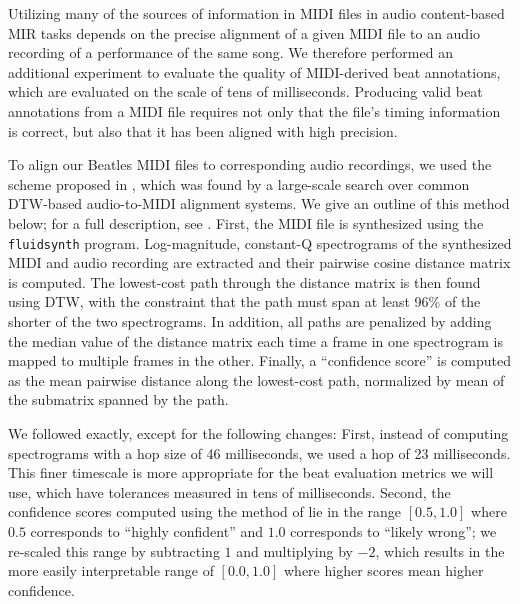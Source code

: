 \documentclass{article}
\begin{document}
Utilizing many of the sources of information in MIDI files in audio content-based MIR tasks depends on the precise alignment of a given MIDI file to an audio recording of a performance of the same song.
We therefore performed an additional experiment to evaluate the quality of MIDI-derived beat annotations, which are evaluated on the scale of tens of milliseconds.
Producing valid beat annotations from a MIDI file requires not only that the file's timing information is correct, but also that it has been aligned with high precision.

To align our Beatles MIDI files to corresponding audio recordings, we used the scheme proposed in \cite{raffel2016optimizing}, which was found by a large-scale search over common DTW-based audio-to-MIDI alignment systems.
We give an outline of this method below; for a full description, see \cite{raffel2016optimizing}.
First, the MIDI file is synthesized using the \texttt{fluidsynth} program.
Log-magnitude, constant-Q spectrograms of the synthesized MIDI and audio recording are extracted and their pairwise cosine distance matrix is computed.
The lowest-cost path through the distance matrix is then found using DTW, with the constraint that the path must span at least 96\% of the shorter of the two spectrograms.
In addition, all paths are penalized by adding the median value of the distance matrix each time a frame in one spectrogram is mapped to multiple frames in the other.
Finally, a ``confidence score'' is computed as the mean pairwise distance along the lowest-cost path, normalized by mean of the submatrix spanned by the path.

We followed \cite{raffel2016optimizing} exactly, except for the following changes:
First, instead of computing spectrograms with a hop size of 46 milliseconds, we used a hop of 23 milliseconds.
This finer timescale is more appropriate for the beat evaluation metrics we will use, which have tolerances measured in tens of milliseconds.
Second, the confidence scores computed using the method of \cite{raffel2016optimizing} lie in the range $[0.5, 1.0]$ where $0.5$ corresponds to ``highly confident'' and $1.0$ corresponds to ``likely wrong''; we re-scaled this range by subtracting $1$ and multiplying by $-2$, which results in the more easily interpretable range of $[0.0, 1.0]$ where higher scores mean higher confidence.
\end{document}
